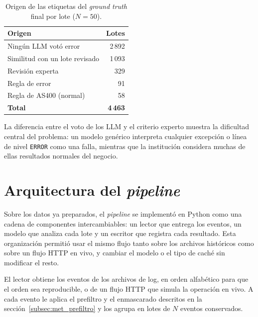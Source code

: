 \begin{table}[H]
\centering
\caption{Origen de las etiquetas del \textit{ground truth} final por lote ($N=50$).}
\label{tab:met_origen}
\small
\begin{tabular}{@{}lr@{}}
\toprule
\textbf{Origen} & \textbf{Lotes} \\
\midrule
Ningún LLM votó error & 2\,892 \\
Similitud con un lote revisado & 1\,093 \\
Revisión experta & 329 \\
Regla de error & 91 \\
Regla de AS400 (normal) & 58 \\
\midrule
\textbf{Total} & \textbf{4\,463} \\
\bottomrule
\end{tabular}
\normalsize
\end{table}

La diferencia entre el voto de los LLM y el criterio experto muestra la dificultad central del problema: un modelo genérico interpreta cualquier excepción o línea de nivel \texttt{ERROR} como una falla, mientras que la institución considera muchas de ellas resultados normales del negocio.

\section{Arquitectura del \textit{pipeline}}\label{sec:met_arquitectura}

Sobre los datos ya preparados, el \textit{pipeline} se implementó en Python como una cadena de componentes intercambiables: un lector que entrega los eventos, un modelo que analiza cada lote y un escritor que registra cada resultado. Esta organización permitió usar el mismo flujo tanto sobre los archivos históricos como sobre un flujo HTTP en vivo, y cambiar el modelo o el tipo de caché sin modificar el resto.


El lector obtiene los eventos de los archivos de log, en orden alfabético para que el orden sea reproducible, o de un flujo HTTP que simula la operación en vivo. A cada evento le aplica el prefiltro y el enmascarado descritos en la sección~\ref{subsec:met_prefiltro} y los agrupa en lotes de $N$ eventos conservados.


